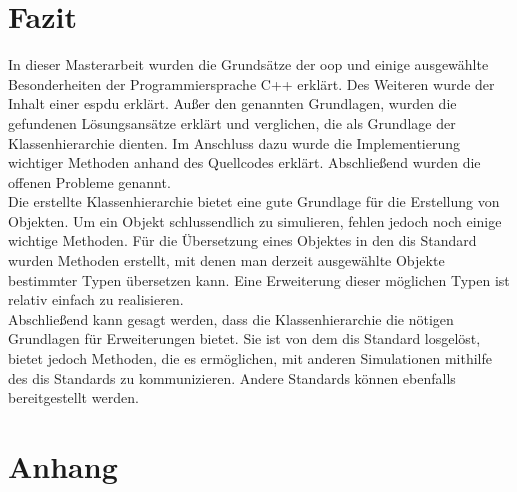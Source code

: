 \chapter{Fazit}
In dieser Masterarbeit wurden die Grundsätze der \acl{oop} und einige ausgewählte Besonderheiten der Programmiersprache C++ erklärt. Des Weiteren wurde der Inhalt einer \ac{espdu} erklärt. 
Außer den genannten Grundlagen, wurden die gefundenen Lösungsansätze erklärt und verglichen, die als Grundlage der Klassenhierarchie dienten. Im Anschluss dazu wurde die Implementierung wichtiger Methoden anhand des Quellcodes erklärt. Abschließend wurden die offenen Probleme genannt. \\
Die erstellte Klassenhierarchie bietet eine gute Grundlage für die Erstellung von Objekten. Um ein Objekt schlussendlich zu simulieren, fehlen jedoch noch einige wichtige Methoden. Für die Übersetzung eines Objektes in den \ac{dis} Standard  wurden Methoden erstellt, mit denen man derzeit ausgewählte Objekte bestimmter Typen übersetzen kann. Eine Erweiterung dieser möglichen Typen ist relativ einfach zu realisieren. \\
Abschließend kann gesagt werden, dass die Klassenhierarchie die nötigen Grundlagen für Erweiterungen bietet. Sie ist von dem \ac{dis} Standard losgelöst, bietet jedoch Methoden, die es ermöglichen, mit anderen Simulationen mithilfe des \ac{dis} Standards zu kommunizieren. Andere Standards können ebenfalls bereitgestellt werden. 


\chapter{Anhang}


\vspace{1cm}



 
